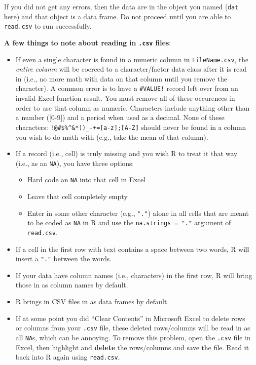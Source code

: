 \documentclass[]{book}
\providecommand{\tightlist}{%
  \setlength{\itemsep}{0pt}\setlength{\parskip}{0pt}}
\theoremstyle{definition}
\theoremstyle{definition}
\theoremstyle{definition}
\theoremstyle{remark}
\begin{document}
If you did not get any errors, then the data are in the object you named
(\texttt{dat} here) and that object is a data frame. Do not proceed
until you are able to \texttt{read.csv} to run successfully.

\textbf{A few things to note about reading in \texttt{.csv} files}:

\begin{itemize}
\item
  If even a single character is found in a numeric column in
  \texttt{FileName.csv}, the \emph{entire column} will be coerced to a
  character/factor data class after it is read in (i.e., no more math
  with data on that column until you remove the character). A common
  error is to have a \texttt{\#VALUE!} record left over from an invalid
  Excel function result. You must remove all of these occurences in
  order to use that column as numeric. Characters include anything other
  than a number ({[}0-9{]}) and a period when used as a decimal. None of
  these characters: \texttt{!@\#\$\%\^{}\&*()\_-+={[}a-z{]};{[}A-Z{]}}
  should never be found in a column you wish to do math with (e.g., take
  the mean of that column).
\item
  If a record (i.e., cell) is truly missing and you wish R to treat it
  that way (i.e., as an \texttt{NA}), you have three options:

  \begin{itemize}
  \tightlist
  \item
    Hard code an \texttt{NA} into that cell in Excel
  \item
    Leave that cell completely empty
  \item
    Enter in some other character (e.g., \texttt{"."}) alone in all
    cells that are meant to be coded as \texttt{NA} in R and use the
    \texttt{na.strings\ =\ "."} argument of \texttt{read.csv}.
  \end{itemize}
\item
  If a cell in the first row with text contains a space between two
  words, R will insert a \texttt{"."} between the words.
\item
  If your data have column names (i.e., characters) in the first row, R
  will bring those in as column names by default.
\item
  R brings in CSV files in as data frames by default.
\item
  If at some point you did ``Clear Contents'' in Microsoft Excel to
  delete rows or columns from your \texttt{.csv} file, these deleted
  rows/columns will be read in as all \texttt{NA}s, which can be
  annoying. To remove this problem, open the \texttt{.csv} file in
  Excel, then highlight and \textbf{delete} the rows/columns and save
  the file. Read it back into R again using \texttt{read.csv}.
\end{itemize}
\end{document}
